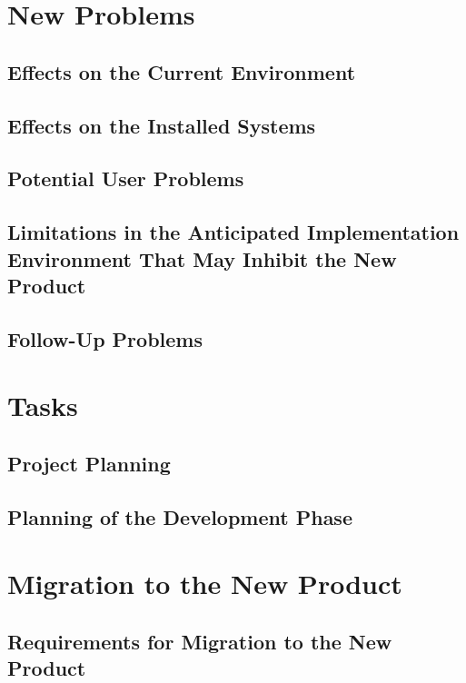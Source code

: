 \documentclass{article}
\begin{document}
\section{New Problems}

\subsection{Effects on the Current Environment}


\subsection{Effects on the Installed Systems}


\subsection{Potential User Problems}


\subsection{Limitations in the Anticipated Implementation Environment That May Inhibit the New Product}


\subsection{Follow-Up Problems}


\section{Tasks}

\subsection{Project Planning}
 

\subsection{Planning of the Development Phase}


\section{Migration to the New Product}

\subsection{Requirements for Migration to the New Product}
\end{document}
